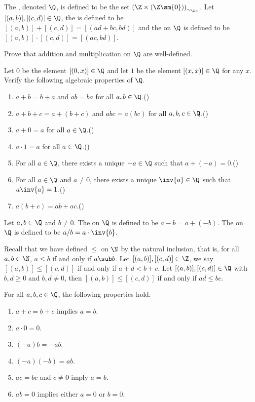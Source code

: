 \documentclass[10pt]{article}
\begin{document}
\begin{definition}
    The , denoted $\Q$, is defined to be the set ${(\Z\times(\Z\sm\{0\}))}_{{\sim}_{\Z\times}}$. Let $[(a,b)],[(c,d)]\in\Q$, the  is defined to be $[(a,b)]+[(c,d)]=[(ad+bc,bd)]$ and the  on $\Q$ is defined to be $[(a,b)]\cdot[(c,d)]=[(ac,bd)]$.
\end{definition}
\begin{problem}
    Prove that addition and multiplication on $\Q$ are well-defined.
\end{problem}
\begin{problem}
    Let $0$ be the element $[(0,x)]\in\Q$ and let $1$ be the element $[(x,x)]\in\Q$ for any $x$. Verify the following algebraic properties of $\Q$.
    \begin{enumerate}
        \item $a+b=b+a$ and $ab=ba$ for all $a,b\in\Q$.\hfill()
        \item $a+b+c=a+(b+c)$ and $abc=a(bc)$ for all $a,b,c\in\Q$.\hfill()
        \item $a+0=a$ for all $a\in\Q$.\hfill()
        \item $a\cdot 1=a$ for all $a\in\Q$.\hfill()
        \item For all $a\in\Q$, there exists a unique $-a\in\Q$ such that $a+(-a)=0$.\hfill()
        \item For all $a\in\Q$ and $a\ne 0$, there exists a unique $\inv{a}\in\Q$ such that $a\inv{a}=1$.\hfill()
        \item $a(b+c)=ab+ac$.\hfill() 
    \end{enumerate}
\end{problem}
\begin{definition}
    Let $a,b\in\Q$ and $b\ne 0$. The  on $\Q$ is defined to be $a-b=a+(-b)$. The  on $\Q$ is defined to be $a/b=a\cdot\inv{b}$.
\end{definition}
\par
Recall that we have defined $\le$ on $\N$ by the natural inclusion, that is, for all $a,b\in\N$, $a\le b$ if and only if $a\sub b$. Let $[(a,b)],[(c,d)]\in\Z$, we say $[(a,b)]\le[(c,d)]$ if and only if $a+d<b+c$. Let $[(a,b)],[(c,d)]\in\Q$ with $b,d\ge 0$ and $b,d\ne 0$, then $[(a,b)]\le[(c,d)]$ if and only if $ad\le bc$.
\begin{proposition}
    For all $a,b,c\in\Q$, the following properties hold.
    \begin{enumerate}
        \item $a+c=b+c$ implies $a=b$.
        \item $a\cdot 0=0$.
        \item $(-a)b=-ab$.
        \item $(-a)(-b)=ab$.
        \item $ac=bc$ and $c\ne 0$ imply $a=b$.
        \item $ab=0$ implies either $a=0$ or $b=0$.
    \end{enumerate}
\end{proposition}
\end{document}
